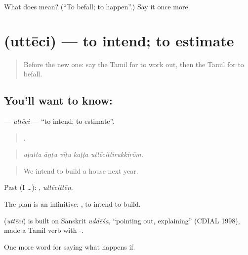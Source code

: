\begin{tcolorbox}[breakable,colback=teal!4,colframe=teal!35!black,title={Before you move on}]
What does  mean? (\textquotedblleft{}To befall; to happen\textquotedblright{}.) Say it once more.
\end{tcolorbox}
\section[\texorpdfstring{\ta{உத்தேசி} (uttēci)}{உத்தேசி (uttēci)}]{ (uttēci) — to intend; to estimate}

\label{lesson:TA-C547-utteci}



\begin{quote}
Before the new one: say the Tamil for to work out, then the Tamil for to befall.
\end{quote}

\subsection*{You'll want to know: }
\textbf{} — \emph{uttēci} — \textquotedblleft{}to intend; to estimate\textquotedblright{}.

\begin{quote}
    .
\end{quote}

\begin{quote}
\emph{aṭutta āṇṭu vīṭu kaṭṭa uttēcittirukkiṟōm.}
\end{quote}

\begin{quote}
We intend to build a house next year.
\end{quote}

Past (I …): , \emph{uttēcittēṉ}.

The plan is an infinitive:  , to intend to build.

\begin{cousinweb}
\textbf{} (\emph{uttēci}) is built on Sanskrit \emph{uddēśa}, \textquotedblleft{}pointing out, explaining\textquotedblright{} (CDIAL 1998), made a Tamil verb with -.
\end{cousinweb}

\begin{grammarlens}[title={What you've built}]
One more word for saying what happens if.
\end{grammarlens}

